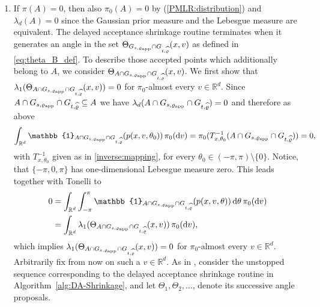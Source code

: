 \documentclass[sn-mathphys-num]{sn-jnl}%
\theoremstyle{thmstyleone}%
\theoremstyle{thmstyletwo}%
\theoremstyle{thmstylethree}%
\newcommand{\change}[1]{\bgroup\color{black}#1\egroup}    %
\begin{document}
\begin{appendices}
\begin{enumerate}
    \item 
    \change{If $\pi(A)=0$, then also $\pi_0(A)=0$ by (\ref{PMLR:distribution}) and $\lambda_d(A)=0$ since the Gaussian prior measure and the Lebesgue measure are equivalent. The delayed acceptance shrinkage routine terminates when it generates an angle in the set $\Theta_{G_{s,\varrho_{\textmd{app}}}\cap G_{t,\widehat{\varrho}}}(x,v)$ as defined in \eqref{eq:theta_B_def}. To describe those accepted points which additionally belong to $A$, we consider $\Theta_{A\cap G_{s,\varrho_{\textmd{app}}}\cap G_{t,\widehat{\varrho}}}(x,v)$. We first show that $\lambda_1(\Theta_{A\cap G_{s,\varrho_{\textmd{app}}}\cap G_{t,\widehat{\varrho}}}(x,v))=0$ for $\pi_0$-almost every $v\in\mathbb R^d$. Since $A\cap G_{s,\varrho_{\textmd{app}}}\cap G_{t,\widehat{\varrho}}\subseteq A$ we have $\lambda_d(A\cap G_{s,\varrho_{\textmd{app}}}\cap G_{t,\widehat{\varrho}})=0$ and therefore as above
    \[
      \int_{\mathbb R^d} \mathbb{1}_{A\cap G_{s,\varrho_{\textmd{app}}}\cap G_{t,\widehat{\varrho}}}(p(x,v,\theta_0)) \, \pi_0(\mathrm{d} v) = \pi_0(T_{x,\theta_0}^{-1}( A\cap G_{s,\varrho_{\textmd{app}}}\cap G_{t,\widehat{\varrho}})) = 0,
    \]
    with $T_{x,\theta_0}^{-1}$ given as in \eqref{inverse:mapping}, for every $\theta_0\in(-\pi,\pi)\setminus\{0\}$. Notice, that $\{-\pi,0,\pi\}$ has one-dimensional Lebesgue measure zero. This leads together with Tonelli to
    \begin{align*}
    0 
    &=\int_{\mathbb R^d} \int_{-\pi}^{\pi} \mathbb{1}_{A\cap G_{s,\varrho_{\textmd{app}}}\cap G_{t,\widehat{\varrho}}}(p(x,v,\theta)) \, \mathrm{d}\theta  \, \pi_0(\mathrm{d} v)\\
    &= \int_{\mathbb R^d} \lambda_1(\Theta_{A\cap G_{s,\varrho_{\textmd{app}}}\cap G_{t,\widehat{\varrho}}}(x,v)) \, \pi_0(\mathrm{d} v),
    \end{align*}
    which implies $\lambda_1(\Theta_{A\cap G_{s,\varrho_{\textmd{app}}}\cap G_{t,\widehat{\varrho}}}(x,v))=0$ for $\pi_0$-almost every $v\in \mathbb R^d$. Arbitrarily fix from now on such a $v\in \mathbb R^d$. As in \citet{HasenpflugEtAl2023}, consider the unstopped sequence corresponding to the delayed acceptance shrinkage routine in Algorithm~\ref{alg:DA-Shrinkage}, and let $\Theta_1, \Theta_2, \dots$, denote its successive angle proposals. 
}
\end{enumerate}
\end{appendices}
\end{document}
